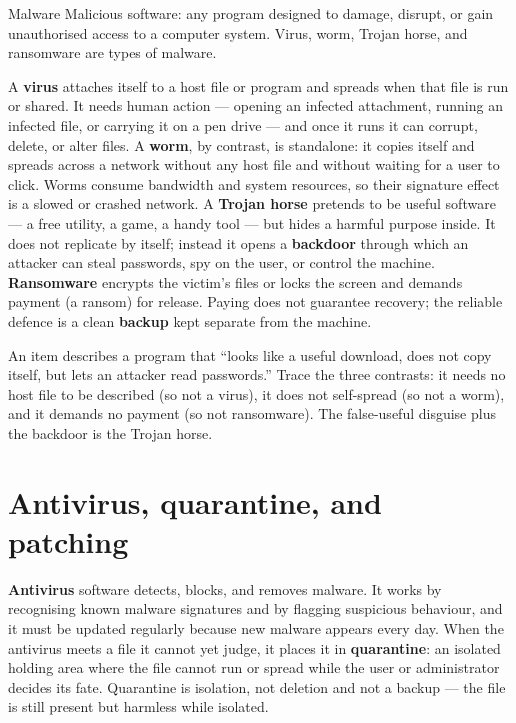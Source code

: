 \begin{definitionbox}{Malware}
Malicious software: any program designed to damage, disrupt, or gain
unauthorised access to a computer system. Virus, worm, Trojan horse, and
ransomware are types of malware.
\end{definitionbox}

A \textbf{virus} attaches itself to a host file or program and spreads when
that file is run or shared. It needs human action --- opening an infected
attachment, running an infected file, or carrying it on a pen drive --- and
once it runs it can corrupt, delete, or alter files. A \textbf{worm}, by
contrast, is standalone: it copies itself and spreads across a network
without any host file and without waiting for a user to click. Worms
consume bandwidth and system resources, so their signature effect is a
slowed or crashed network. A \textbf{Trojan horse} pretends to be useful
software --- a free utility, a game, a handy tool --- but hides a harmful
purpose inside. It does not replicate by itself; instead it opens a
\textbf{backdoor} through which an attacker can steal passwords, spy on the
user, or control the machine. \textbf{Ransomware} encrypts the victim's
files or locks the screen and demands payment (a ransom) for release.
Paying does not guarantee recovery; the reliable defence is a clean
\textbf{backup} kept separate from the machine.

\begin{example}
An item describes a program that ``looks like a useful download, does not
copy itself, but lets an attacker read passwords.'' Trace the three
contrasts: it needs no host file to be described (so not a virus), it does
not self-spread (so not a worm), and it demands no payment (so not
ransomware). The false-useful disguise plus the backdoor is the Trojan
horse.
\end{example}

\section{Antivirus, quarantine, and patching}
\textbf{Antivirus} software detects, blocks, and removes malware. It works
by recognising known malware signatures and by flagging suspicious
behaviour, and it must be updated regularly because new malware appears
every day. When the antivirus meets a file it cannot yet judge, it places
it in \textbf{quarantine}: an isolated holding area where the file cannot
run or spread while the user or administrator decides its fate. Quarantine
is isolation, not deletion and not a backup --- the file is still present
but harmless while isolated.

